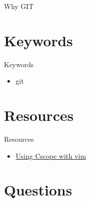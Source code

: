 \documentclass{workshop}
\begin{document}
\begin{frame}{Why GIT}
\end{frame}

\section{Keywords}

\begin{frame}{Keywords}
     \begin{itemize}
	\item git
      \end{itemize}
\end{frame}

\section{Resources}
\begin{frame}{Resources}
  \begin{itemize}
  \item \href{http://cscope.sourceforge.net/cscope_vim_tutorial.html}{Using Cscope with vim}
  \end{itemize}
\end{frame}

\section{Questions}
\end{document}
